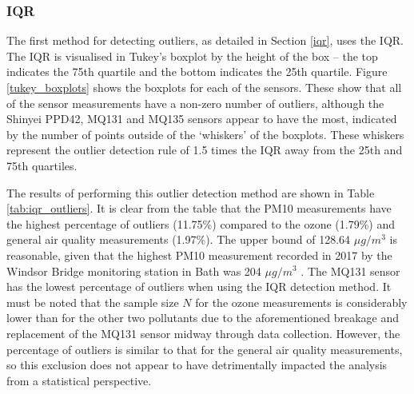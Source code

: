 \documentclass[11pt]{report}
\begin{document}
\subsubsection{IQR}

The first method for detecting outliers, as detailed in Section \ref{iqr}, uses the IQR. The IQR is visualised in Tukey's boxplot by the height of the box -- the top indicates the 75th quartile and the bottom indicates the 25th quartile. Figure \ref{tukey_boxplots} shows the boxplots for each of the sensors. These show that all of the sensor measurements have a non-zero number of outliers, although the Shinyei PPD42, MQ131 and MQ135 sensors appear to have the most, indicated by the number of points outside of the `whiskers' of the boxplots. These whiskers represent the outlier detection rule of 1.5 times the IQR away from the 25th and 75th quartiles.

The results of performing this outlier detection method are shown in Table \ref{tab:iqr_outliers}. It is clear from the table that the PM10 measurements have the highest percentage of outliers (11.75\%) compared to the ozone (1.79\%) and general air quality measurements (1.97\%). The upper bound of 128.64 $\mu g/m^3$ is reasonable, given that the highest PM10 measurement recorded in 2017 by the Windsor Bridge monitoring station in Bath was 204 $\mu g/m^3$ \citep{courthold2018max}. The MQ131 sensor has the lowest percentage of outliers when using the IQR detection method. It must be noted that the sample size $N$ for the ozone measurements is considerably lower than for the other two pollutants due to the aforementioned breakage and replacement of the MQ131 sensor midway through data collection. However, the percentage of outliers is similar to that for the general air quality measurements, so this exclusion does not appear to have detrimentally impacted the analysis from a statistical perspective.

\end{document}
